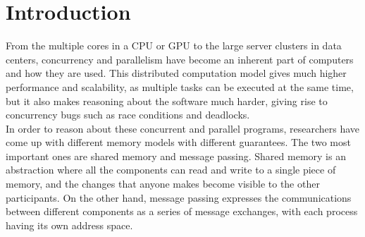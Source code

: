 \documentclass[12pt,twoside]{report}
\begin{document}



\clearpage{\pagestyle{empty}\cleardoublepage}
\setcounter{page}{1}
\pagestyle{fancy}


\cleardoublepage


\tableofcontents 


\clearpage{\pagestyle{empty}\cleardoublepage}
\setcounter{page}{1}
\fancyhead[LE,RO]{\slshape \rightmark}
\fancyhead[LO,RE]{\slshape \leftmark}

\chapter{Introduction}
From the multiple cores in a CPU or GPU to the large server clusters in data centers, concurrency and parallelism have become an inherent part of computers and how they are used. This distributed computation model gives much higher performance and scalability, as multiple tasks can be executed at the same time, but it also makes reasoning about the software much harder, giving rise to concurrency bugs such as race conditions and deadlocks.\\

In order to reason about these concurrent and parallel programs, researchers have come up with different memory models with different guarantees. The two most important ones are shared memory and message passing. Shared memory is an abstraction where all the components can read and write to a single piece of memory, and the changes that anyone makes become visible to the other participants. On the other hand, message passing expresses the communications between different components as a series of message exchanges, with each process having its own address space. %
\\
\end{document}
